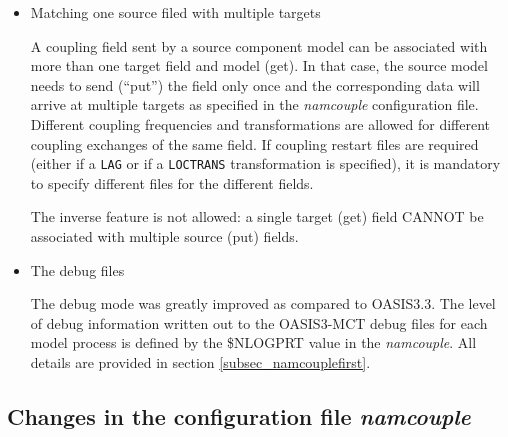 \begin{itemize}
\item Matching one source filed with multiple targets

  A coupling field sent by a source component model can be associated
  with more than one target field and model (get). In that case, the
  source model needs to send (``put'') the field only once and the
  corresponding data will arrive at multiple targets as specified in
  the {\it namcouple} configuration file. Different coupling
  frequencies and transformations are allowed for different coupling
  exchanges of the same field. If coupling restart files are required
  (either if a {\tt LAG} or if a {\tt LOCTRANS} transformation is
  specified), it is mandatory to specify different files for the
  different fields.

The inverse feature is not allowed: a single target (get) field
CANNOT be associated with multiple source (put) fields.

\item The debug files

The debug mode was greatly improved as compared to OASIS3.3. The level
of debug information written out to the OASIS3-MCT debug files for
each model process is defined by the \$NLOGPRT value in the {\it
  namcouple}. All details are provided in section
\ref{subsec_namcouplefirst}.

\end{itemize}

\subsection{Changes in the configuration file {\it namcouple}}
\label{sec_changes_namcouple}

